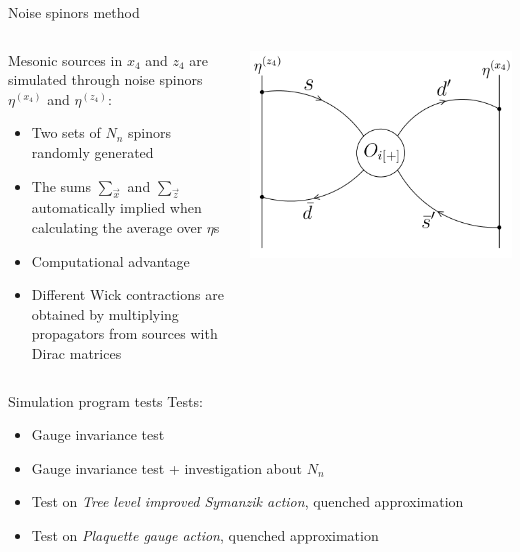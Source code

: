 \documentclass{beamer}
\begin{document}
\begin{frame}{Noise spinors method}
      \begin{columns}
            \begin{column}{0.65\textwidth}
                  Mesonic sources in $x_4$ and $z_4$ are simulated through noise spinors $\eta^{(x_4)}$ and $\eta^{(z_4)}$:
                  \begin{itemize}%
                        \item Two sets of $N_n$ spinors randomly generated
                        \item The sums $\sum_{\vec{x}}$ and $\sum_{\vec{z}}$ automatically implied when calculating the average over $\eta$s
                        \item Computational advantage
                        \item Different Wick contractions are obtained by multiplying propagators from sources with Dirac matrices
                  \end{itemize}
            \end{column}
            \begin{column}{0.35\textwidth}
                  \includegraphics[width=\textwidth]{assets/eta-spinors.png}
            \end{column}
      \end{columns}
\end{frame}

\begin{frame}{Simulation program tests}
      Tests:
      \begin{itemize}
            \item Gauge invariance test
            \item Gauge invariance test + investigation about $N_n$
            \item Test on \emph{Tree level improved Symanzik action}, quenched approximation
            \item Test on \emph{Plaquette gauge action}, quenched approximation
      \end{itemize}
\end{frame}
\end{document}
